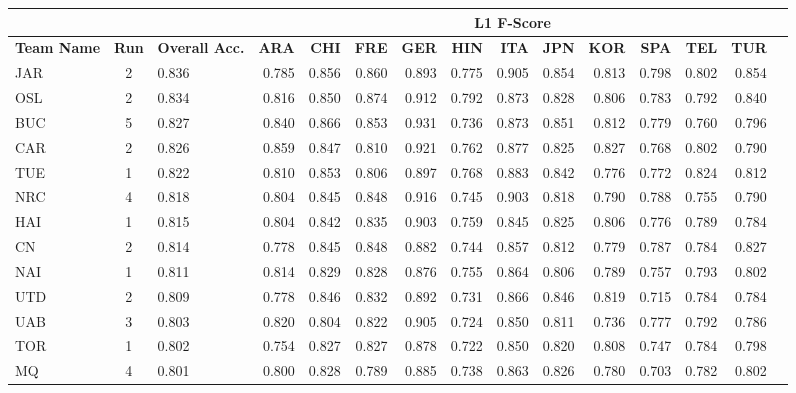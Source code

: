 \documentclass[11pt,letterpaper]{article}
\begin{document}
\begin{table*}
\begin{small}
\begin{tabular}{|p{1cm}|c|p{1cm}|r|r|r|r|r|r|r|r|r|r|r|r|}
\hline

\multicolumn{3}{|c|}{} & \multicolumn{11}{|c|}{\bf L1 F-Score}\\\hline
{\bf Team Name} & {\bf Run} & {\bf Overall Acc.} & {\bf ARA} & {\bf CHI} & {\bf FRE} & {\bf GER} & {\bf HIN} & {\bf ITA} & {\bf JPN} & {\bf KOR} & {\bf SPA} & {\bf TEL} & {\bf TUR}\\\hline
  JAR & 2  & 0.836 & 0.785 & 0.856 & 0.860 & 0.893 & 0.775 & 0.905 & 0.854 & 0.813 & 0.798 & 0.802 & 0.854\\\hline
OSL   & 2  & 0.834 & 0.816 & 0.850 & 0.874 & 0.912 & 0.792 & 0.873 & 0.828 & 0.806 & 0.783 & 0.792 & 0.840\\\hline
 BUC  & 5  & 0.827 & 0.840 & 0.866 & 0.853 & 0.931 & 0.736 & 0.873 & 0.851 & 0.812 & 0.779 & 0.760 & 0.796\\\hline
CAR   & 2  & 0.826 & 0.859 & 0.847 & 0.810 & 0.921 & 0.762 & 0.877 & 0.825 & 0.827 & 0.768 & 0.802 & 0.790\\\hline
  TUE & 1  & 0.822 & 0.810 & 0.853 & 0.806 & 0.897 & 0.768 & 0.883 & 0.842 & 0.776 & 0.772 & 0.824 & 0.812\\\hline
 NRC  & 4  & 0.818 & 0.804 & 0.845 & 0.848 & 0.916 & 0.745 & 0.903 & 0.818 & 0.790 & 0.788 & 0.755 & 0.790\\\hline
HAI   & 1  & 0.815 & 0.804 & 0.842 & 0.835 & 0.903 & 0.759 & 0.845 & 0.825 & 0.806 & 0.776 & 0.789 & 0.784\\\hline
 CN  & 2  & 0.814 & 0.778 & 0.845 & 0.848 & 0.882 & 0.744 & 0.857 & 0.812 & 0.779 & 0.787 & 0.784 & 0.827\\\hline
 NAI  & 1  & 0.811 & 0.814 & 0.829 & 0.828 & 0.876 & 0.755 & 0.864 & 0.806 & 0.789 & 0.757 & 0.793 & 0.802\\\hline
 UTD  & 2  & 0.809 & 0.778 & 0.846 & 0.832 & 0.892 & 0.731 & 0.866 & 0.846 & 0.819 & 0.715 & 0.784 & 0.784\\\hline
 UAB  & 3  & 0.803 & 0.820 & 0.804 & 0.822 & 0.905 & 0.724 & 0.850 & 0.811 & 0.736 & 0.777 & 0.792 & 0.786\\\hline
 TOR  & 1  & 0.802 & 0.754 & 0.827 & 0.827 & 0.878 & 0.722 & 0.850 & 0.820 & 0.808 & 0.747 & 0.784 & 0.798\\\hline
  MQ & 4  & 0.801 & 0.800 & 0.828 & 0.789 & 0.885 & 0.738 & 0.863 & 0.826 & 0.780 & 0.703 & 0.782 & 0.802\\\hline

\end{tabular}
\end{small}
\end{table*}
\end{document}
